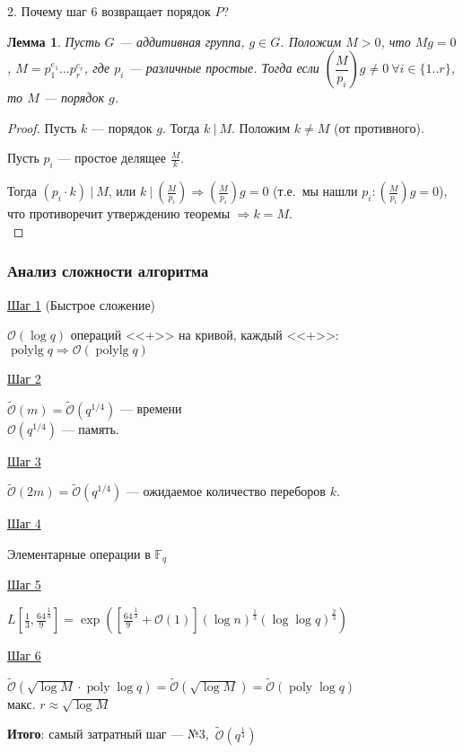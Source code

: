 \documentclass[12pt]{article}
\newcommand{\F}{{{\mathbb F}}}
\newcommand{\bigO}{\mathcal{O}}
\newcommand{\softO}{\widetilde{\bigO}}
\newtheorem{lemma}[theorem]{Лемма}
\theoremstyle{definition}
\theoremstyle{definition}
\theoremstyle{definition}
\begin{document}
2. Почему шаг 6 возвращает порядок $P$?
\begin{lemma}
    Пусть $G$ — аддитивная группа, $g \in G$. Положим $M > 0$, что $Mg = 0$, $M = p_1^{e_1}...p_r^{e_r}$, где $p_i$ — различные простые. Тогда если $\left(\dfrac{M}{p_i}\right)g \neq 0\ \forall i \in \{1..r\}$, то $M$ — порядок $g$.
\end{lemma}
\begin{proof}
    Пусть $k$ — порядок $g$. Тогда $k\ |\ M$. Положим $k \neq M$ (от противного).
    
    Пусть $p_i$ — простое делящее $\frac{M}{k}$.
    
    Тогда $(p_i \cdot k)\ |\ M$, или $k\ |\ \left(\frac{M}{p_i}\right) \Rightarrow \left(\frac{M}{p_i}\right)g = 0$ (т.е.\ мы нашли $p_i: \left(\frac{M}{p_i}\right)g = 0$), что противоречит утверждению теоремы $\Rightarrow k = M$.\\
\end{proof}

\subsubsection{Анализ сложности алгоритма}

\underline{Шаг 1} (Быстрое сложение)

$\bigO(\log q)$ операций <<+>> на кривой, каждый <<+>>: $\operatorname{poly lg} q \Rightarrow \bigO(\operatorname{poly lg} q)$

\underline{Шаг 2}

$\softO(m) = \softO(q^{1/4})$ — времени \\
${\bigO}(q^{1/4})$ — память.

\underline{Шаг 3}

$\softO(2m) = \softO(q^{1/4})$ — ожидаемое количество переборов $k$.

\underline{Шаг 4}

Элементарные операции в $\F_q$

\underline{Шаг 5}

$L\left[\frac{1}{3}, \frac{64}{9}^{\frac{1}{3}}\right] = \exp{\left(\left[\frac{64}{9}^{\frac{1}{3}} + \bigO(1)\right] (\log n)^{\frac{1}{3}} (\log \log q)^{\frac{2}{3}} \right)}$

\underline{Шаг 6}

$\softO(\sqrt{\log M} \cdot \operatorname{poly} \log q) = \softO(\sqrt{\log M}) = \softO(\operatorname{poly} \log q)$\\
макс. $r \approx \sqrt{\log M}$

\textbf{Итого}: самый затратный шаг — №3,\ $\softO(q^{\frac{1}{4}})$
\end{document}
